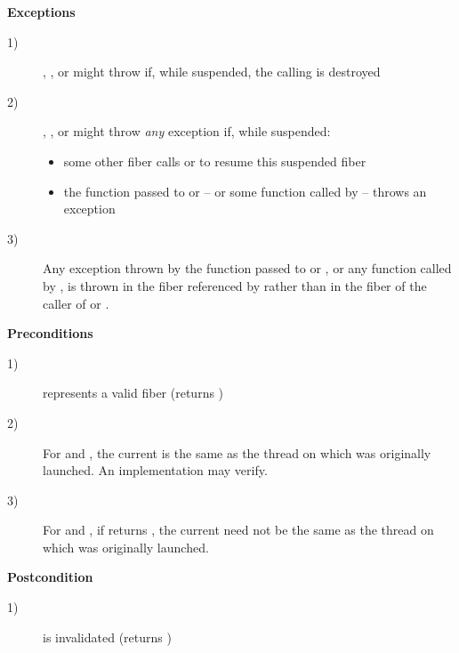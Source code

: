 {\bfseries Exceptions}
\begin{description}
    \item[1)] \resume, \resumewith, \xtresume or \xtresumewith might throw \unwindex if, while suspended,
              the calling \xtfiber is destroyed
    \item[2)] \resume, \resumewith, \xtresume or \xtresumewith might throw \emph{any} exception if,
              while suspended:
              \begin{itemize}
                  \item some other fiber calls \resumewith or \xtresumewith to resume this
                        suspended fiber
                  \item the function  passed to \resumewith or \xtresumewith -- or some
                        function called by  -- throws an exception
              \end{itemize}
    \item[3)] Any exception thrown by the function  passed to
              \resumewith or \xtresumewith, or any function called by , is thrown in the
              fiber referenced by  rather than in the fiber of
              the caller of \resumewith or \xtresumewith.
\end{description}

{\bfseries Preconditions}
\begin{description}
    \item[1)]  represents a valid fiber (\opbool returns )
    \item[2)] For \resume and \resumewith, the current \thread is the same as the thread on which
               was originally launched. An implementation may verify.
    \item[3)] For \xtresume and \xtresumewith, if \anythread returns
              , the current \thread need not be the same as the
              thread on which  was originally launched.
\end{description}

{\bfseries Postcondition}
\begin{description}
    \item[1)]  is invalidated (\opbool returns )
\end{description}

